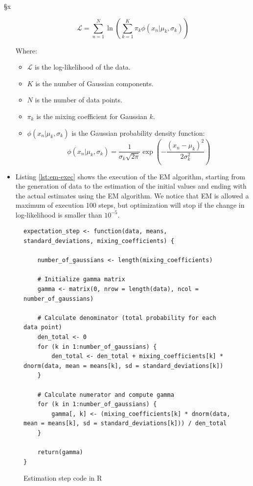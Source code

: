 §x\documentclass[]{article}
\begin{document}
\begin{itemize}
	$$
	\mathcal{L} = \sum_{n=1}^{N} \ln \left( \sum_{k=1}^{K} \pi_k \phi(x_n | \mu_k, \sigma_k) \right)
	$$
	
	Where:
	\begin{itemize}
		\item $\mathcal{L}$ is the log-likelihood of the data.
		\item $K$ is the number of Gaussian components.
		\item $N$ is the number of data points.
		\item $\pi_k$ is the mixing coefficient for Gaussian $k$.
		\item $\phi(x_n | \mu_k, \sigma_k)$ is the Gaussian probability density function:
		$$
		\phi(x_n | \mu_k, \sigma_k) = \frac{1}{\sigma_k \sqrt{2\pi}} \exp \left( -\frac{(x_n - \mu_k)^2}{2\sigma_k^2} \right)
		$$
	\end{itemize}
	
	\item Listing \ref{lst:em-exec} shows the execution of the EM algorithm, starting from the generation of data to the estimation of the initial values and ending with the actual estimates using the EM algorithm. We notice that EM is allowed a maximum of execution 100 steps, but optimization will stop if the change in log-likelihood is smaller than $10^{-5}$.
	
	

\end{itemize}




\begin{figure}[H]
	\captionsetup{type=lstlisting}
	\begin{lstlisting}
expectation_step <- function(data, means, standard_deviations, mixing_coefficients) {
	
	number_of_gaussians <- length(mixing_coefficients)
	
	# Initialize gamma matrix
	gamma <- matrix(0, nrow = length(data), ncol = number_of_gaussians)
	
	# Calculate denominator (total probability for each data point)
	den_total <- 0
	for (k in 1:number_of_gaussians) {
		den_total <- den_total + mixing_coefficients[k] * dnorm(data, mean = means[k], sd = standard_deviations[k])
	}
	
	# Calculate numerator and compute gamma
	for (k in 1:number_of_gaussians) {
		gamma[, k] <- (mixing_coefficients[k] * dnorm(data, mean = means[k], sd = standard_deviations[k])) / den_total
	}
	
	return(gamma)
}			
		\end{lstlisting}
	\caption{Estimation step code in R}
	\label{lst:em-est}
\end{figure}
\end{document}
